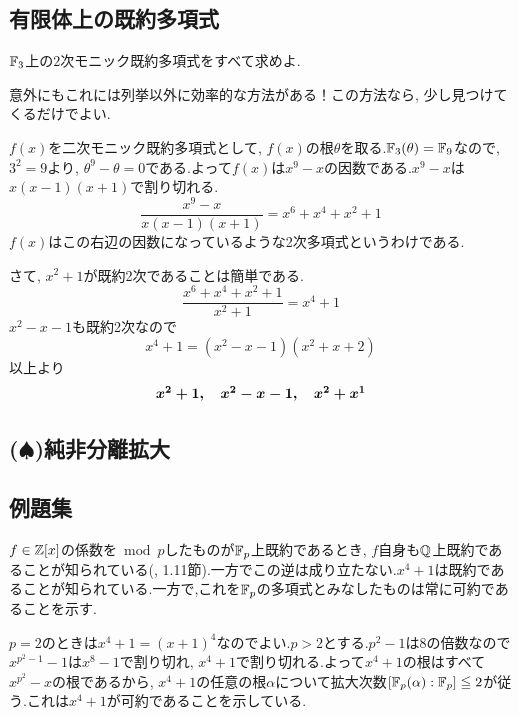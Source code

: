 \subsection{有限体上の既約多項式}
\begin{egprob}
$\mathbb{F}_{3}$上の$2$次モニック既約多項式をすべて求めよ.
\end{egprob}
\begin{screen}
意外にもこれには列挙以外に効率的な方法がある！この方法なら, 少し見つけてくるだけでよい.
\end{screen}
\begin{egans}
$f(x)$を二次モニック既約多項式として, $f(x)$の根$\theta$を取る.$\mathbb{F}_{3}(\theta) = \mathbb{F}_{9}$なので, $3^{2} = 9$より, $\theta^{9}-\theta = 0$である.よって$f(x)$は$x^{9}-x$の因数である.$x^{9}-x$は$x(x-1)(x+1)$で割り切れる.
\[\dfrac{x^{9} - x}{x(x-1)(x+1)} = x^{6} + x^{4} + x^{2} + 1\]
$f(x)$はこの右辺の因数になっているような2次多項式というわけである.\par
さて, $x^2+1$が既約2次であることは簡単である.
\[\dfrac{x^{6}+x^{4} + x^2+1}{x^2+1} = x^4 + 1\]
$x^2-x-1$も既約2次なので
\[x^{4} + 1 = (x^2-x-1)(x^2+x+2)\]
以上より
\[{\mbox{\boldmath $x^2+1,\quad x^2-x-1,\quad x^2+x^1$}}\]
\end{egans}




\subsection{($\spadesuit$)純非分離拡大}






\subsection{例題集}





\begin{egprob}
$f\in \mathbb{Z}[x]$の係数を$\bmod{p}$したものが$\mathbb{F}_{p}$上既約であるとき, $f$自身も$\mathbb{Q}$上既約であることが知られている(\cite{aoyukie}, 1.11節).一方でこの逆は成り立たない.$x^{4}+1$は既約であることが知られている.一方で,これを$\mathbb{F}_{p}$の多項式とみなしたものは常に可約であることを示す.

$p=2$のときは$x^{4}+1=(x+1)^4$なのでよい.$p>2$とする.$p^2-1$は$8$の倍数なので$x^{p^{2} - 1} - 1$は$x^{8} - 1$で割り切れ, $x^{4}+1$で割り切れる.よって$x^{4}+1$の根はすべて$x^{p^2} - x$の根であるから, $x^{4}+1$の任意の根$\alpha$について拡大次数$[\mathbb{F}_{p}(\alpha):\mathbb{F}_{p}] \leqq 2$が従う.これは$x^{4}+1$が可約であることを示している.\bbox
\end{egprob}

